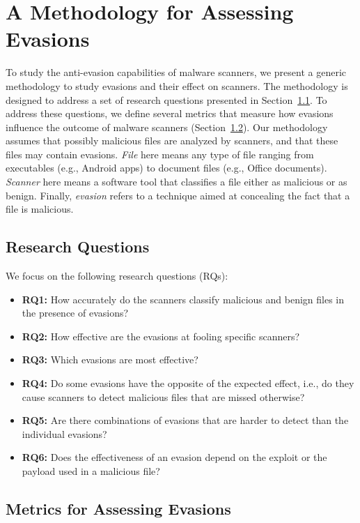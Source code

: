 \section{A Methodology for Assessing Evasions}
\label{ss:methodology}

To study the anti-evasion capabilities of malware scanners, we present a generic methodology to study evasions and their effect on scanners.
The methodology is designed to address a set of research questions presented in Section~\ref{ss: questions}.
To address these questions, we define several metrics that measure how evasions influence the outcome of malware scanners (Section~\ref{ss: metrics}).
Our methodology assumes that possibly malicious files are analyzed by scanners, and that these files may contain evasions.
\emph{File} here means any type of file ranging from executables (e.g., Android apps) to document files (e.g., Office documents).
\emph{Scanner} here means a software tool that classifies a file either as malicious or as benign.
Finally, \emph{evasion} refers to a technique aimed at concealing the fact that a file is malicious.

\subsection{Research Questions}
\label{ss: questions}

We focus on the following research questions (RQs):

\begin{itemize}
    \item \textbf{RQ1:} How accurately do the scanners classify malicious and benign files in the presence of evasions?
    \item \textbf{RQ2:} How effective are the evasions at fooling specific scanners?
    \item \textbf{RQ3:} Which evasions are most effective?
    \item \textbf{RQ4:} Do some evasions have the opposite of the expected effect, i.e.,
      do they cause scanners to detect  malicious files that are missed otherwise?
    \item \textbf{RQ5:} Are there combinations of evasions that are harder to detect than the individual evasions?
    \item \textbf{RQ6:} Does the effectiveness of an evasion depend on the exploit or the payload used in a malicious file?
\end{itemize}

\subsection{Metrics for Assessing Evasions}
\label{ss: metrics}


